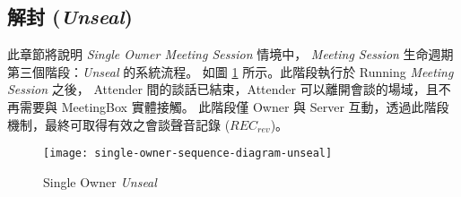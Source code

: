\subsection{解封 ({\it Unseal})}
\label{subsec.unseal}

    此章節將說明 {\it Single Owner Meeting Session} 情境中，
{\it Meeting Session} 生命週期第三個階段：{\it Unseal} 的系統流程。
如圖 \ref{fig.s-o-unseal} 所示。此階段執行於 Running {\it Meeting Session} 之後，
Attender 間的談話已結束，Attender 可以離開會談的場域，且不再需要與 MeetingBox 實體接觸。
此階段僅 Owner 與 Server 互動，透過此階段機制，最終可取得有效之會談聲音記錄 ($REC_{rev}$)。

\begin{figure}[H]
    \centering
    \texttt{[image: single-owner-sequence-diagram-unseal]}
    \caption{Single Owner {\it Unseal}}
    \label{fig.s-o-unseal}
\end{figure}


